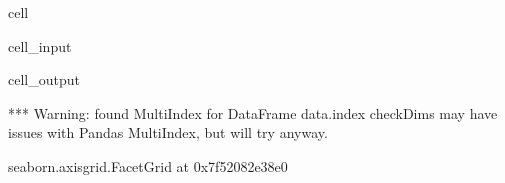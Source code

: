\documentclass[letterpaper,table,10pt,english]{jupyterBook}
\begin{document}
\begin{sphinxuseclass}{cell}\begin{sphinxVerbatimInput}

\begin{sphinxuseclass}{cell_input}
\begin{sphinxVerbatim}[commandchars=\\\{\}]
  
     
                 
                     
\end{sphinxVerbatim}

\end{sphinxuseclass}\end{sphinxVerbatimInput}
\begin{sphinxVerbatimOutput}

\begin{sphinxuseclass}{cell_output}
\begin{sphinxVerbatim}[commandchars=\\\{\}]
*** Warning: found MultiIndex for DataFrame data.index \PYGZhy{} checkDims may have issues with Pandas MultiIndex, but will try anyway.
\end{sphinxVerbatim}

\begin{sphinxVerbatim}[commandchars=\\\{\}]
\PYGZlt{}seaborn.axisgrid.FacetGrid at 0x7f52082e38e0\PYGZgt{}
\end{sphinxVerbatim}

\noindent{}

\end{sphinxuseclass}\end{sphinxVerbatimOutput}

\end{sphinxuseclass}
\end{document}
